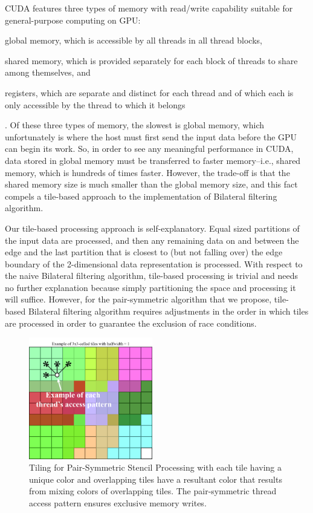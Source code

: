 \documentclass{IEEEtran}
\begin{document}
CUDA features three types of memory with read/write capability suitable for general-purpose computing on GPU: \begin{inparaenum}[(i)] \item global memory, which is accessible by all threads in all thread blocks, \item shared memory, which is provided separately for each block of threads to share among themselves, and \item registers, which are separate and distinct for each thread and of which each is only accessible by the thread to which it belongs\end{inparaenum}. Of these three types of memory, the slowest is global memory, which unfortunately is where the host must first send the input data before the GPU can begin its work. So, in order to see any meaningful performance in CUDA, data stored in global memory must be transferred to faster memory--i.e., shared memory, which is hundreds of times faster. However, the trade-off is that the shared memory size is much smaller than the global memory size, and this fact compels a tile-based approach to the implementation of Bilateral filtering algorithm.

Our tile-based processing approach is self-explanatory. Equal sized partitions of the input data are processed, and then any remaining data on and between the edge and the last partition that is closest to (but not falling over) the edge boundary of the 2-dimensional data representation is processed. With respect to the naive Bilateral filtering algorithm, tile-based processing is trivial and needs no further explanation because simply partitioning the space and processing it will suffice. However, for the pair-symmetric algorithm that we propose, tile-based Bilateral filtering algorithm requires adjustments in the order in which tiles are processed in order to guarantee the exclusion of race conditions. 

\begin{figure}
\includegraphics[width=0.48\textwidth]{images/stackedtiles}
\caption{Tiling for Pair-Symmetric Stencil Processing with each tile having a unique color and overlapping tiles have a resultant color that results from mixing colors of overlapping tiles. The pair-symmetric thread access pattern ensures exclusive memory writes.}
\label{fig:Tiling-for-Pair-Symmetric}
\end{figure}
\end{document}
